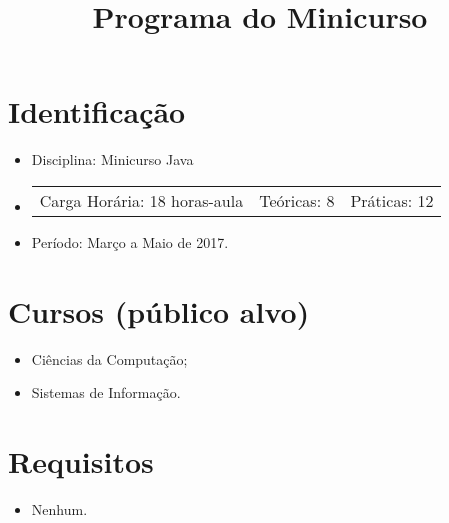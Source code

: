 \documentclass{article}
\title{Programa do Minicurso}
\author{}
\date{}
\begin{document}
\maketitle

\section{Identificação}

\begin{itemize}
    \item[] Disciplina: Minicurso Java
    \item[]
        \hspace{-1em}
        \begin{tabular}{ccc}
            Carga Horária: 18 horas-aula&
            Teóricas: 8&
            Práticas: 12
        \end{tabular}
    \item[] Período: Março a Maio de 2017.
\end{itemize}

\section{Cursos (público alvo)}
\begin{itemize}
    \item[] Ciências da Computação;
    \item[] Sistemas de Informação.
\end{itemize}

\section{Requisitos}
\begin{itemize}
    \item[] Nenhum.
\end{itemize}
\end{document}
